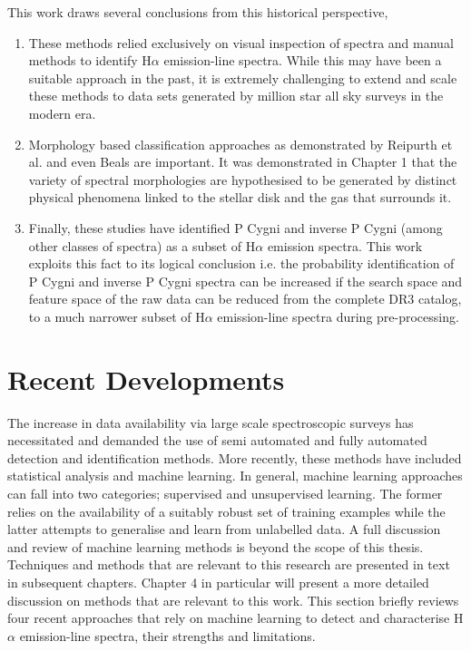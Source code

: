 This work draws several conclusions from this historical perspective,

\begin{enumerate}
\item These methods relied exclusively on visual inspection of spectra and manual methods to identify H$\alpha$ emission-line spectra. While this may have been a suitable approach in the past, it is extremely challenging to extend and scale these methods to data sets generated by million star all sky surveys in the modern era.

\item Morphology based classification approaches as demonstrated by Reipurth et al. and even Beals are important. It was demonstrated in Chapter 1 that the variety of spectral morphologies are hypothesised to be generated by distinct physical phenomena linked to the stellar disk and the gas that surrounds it.

\item Finally, these studies have identified P Cygni and inverse P Cygni (among other classes of spectra) as a subset of H$\alpha$ emission spectra. This work exploits this fact to its logical conclusion i.e. the probability identification of P Cygni and inverse P Cygni spectra can be increased if the search space and feature space of the raw data can be reduced from the complete DR3 catalog, to a much narrower subset of H$\alpha$ emission-line spectra during pre-processing. 
\end{enumerate}

\section{Recent Developments}

The increase in data availability via large scale spectroscopic surveys has necessitated and demanded the use of semi automated and fully automated detection and identification methods. More recently, these methods have included statistical analysis and machine learning. In general, machine learning approaches can fall into two categories; supervised and unsupervised learning. The former relies on the availability of a suitably robust set of training examples while the latter attempts to generalise and learn from unlabelled data\cite{hastie2009elements}. A full discussion and review of machine learning methods is beyond the scope of this thesis. Techniques and methods that are relevant to this research are presented in text in subsequent chapters. Chapter 4 in particular will present a more detailed discussion on methods that are relevant to this work. This section briefly reviews four recent approaches that rely on machine learning to detect and characterise H$\alpha$ emission-line spectra, their strengths and limitations.

